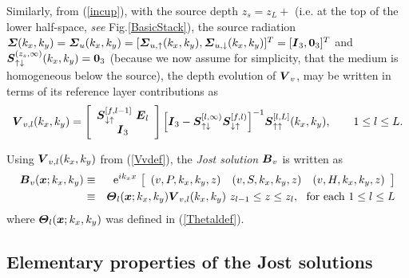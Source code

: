Similarly, from (\ref{incup}),  with the source depth $z_s=z_{L}+$ (i.e. 
at the top of the lower half-space, {\em see\/} Fig.\ref{BasicStack}), the  source radiation 
${\mbox{\boldmath$\mit \Sigma$\unboldmath}}(k_{x},k_{y})={\mbox{\boldmath$\mit \Sigma$\unboldmath}}_{u}(k_{x},k_{y})=[{\mbox{\boldmath$\mit \Sigma$\unboldmath}}_{u,\uparrow}(k_{x},k_{y}),{\mbox{\boldmath$\mit \Sigma$\unboldmath}}_{u,\downarrow}(k_{x},k_{y})]^{T}=
[{\mbox{\boldmath$\mit I$\unboldmath}}_{3 },{\bf 0}_{3 }]^{T}$ and 
${\mbox{\boldmath$\mit S$\unboldmath}}{}_{\uparrow\downarrow}^{(z_s, \infty)}(k_{x},k_{y})={\bf 0}_{3 }$ (because we now 
assume for simplicity, that the medium is homogeneous below the source),   
the depth evolution of ${\mbox{\boldmath$\mit V$\unboldmath}}_{v}$, may be written in terms of its reference layer 
contributions as
\begin{equation} \label{Vvdef} 
{{\mbox{\boldmath$\mit V$\unboldmath}}}_{ v,l}(k_{x},k_{y})=
\left[{\begin{array}{c} 
{\mbox{\boldmath$\mit S$\unboldmath}}{}_{\downarrow \uparrow}^{[f, l-1]}\ {{\mbox{\boldmath$\mit E$\unboldmath}}}_{l} 
\\{\mbox{\boldmath$\mit I$\unboldmath}}_{3 }\end{array}}\right]
 {\left[{  {\mbox{\boldmath$\mit I$\unboldmath}}_{3 }- 
 {\mbox{\boldmath$\mit S$\unboldmath}}{}_{ \uparrow \downarrow }^{[l, \infty)} 
 {\mbox{\boldmath$\mit S$\unboldmath}}{}_{\downarrow \uparrow }^{[f, l)} }\right]}^{-1}
 {\mbox{\boldmath$\mit S$\unboldmath}}{}_{\uparrow \uparrow }^{ [l, L]}(k_{x},k_{y}), \qquad 1 \le l \le L .
\end{equation}

Using ${\mbox{\boldmath$\mit V$\unboldmath}}_{ v,l}(k_{x},k_{y})$ from (\ref{Vvdef}), the {\em 
Jost solution\/} ${\mbox{\boldmath$\mit B$\unboldmath}}_{v}$ is written as
\begin{eqnarray}\label{Bvdef}
{\mbox{\boldmath$\mit B$\unboldmath}}_{v}({\mbox{\boldmath$\mit x$\unboldmath}};k_{x},k_{y})
&\equiv&{\rm e}^{i{ k}_{x} x}\,\left[\begin{array}{ccc} 
(v,P,k_x,k_{y},z)&(v,S,k_x,k_{y},z)
&(v,H,k_x,k_{y},z)\end{array} \right]\nonumber\\
&\equiv&{\mbox{\boldmath$\mit \Theta$\unboldmath}}_{l}({\mbox{\boldmath$\mit x$\unboldmath}};k_{x},k_{y}){{\mbox{\boldmath$\mit V$\unboldmath}}}_{v,l}(k_{x},k_{y})
\  z_{l-1} \le z \le{z}_{l}, \ \ \mbox{for each} \  1 \le    l \le   L
\end{eqnarray}
where ${\mbox{\boldmath$\mit \Theta$\unboldmath}}_{l}({\mbox{\boldmath$\mit x$\unboldmath}};k_{x},k_{y})$ was defined in 
(\ref{Thetaldef}).
\subsection{Elementary properties of the Jost solutions}

